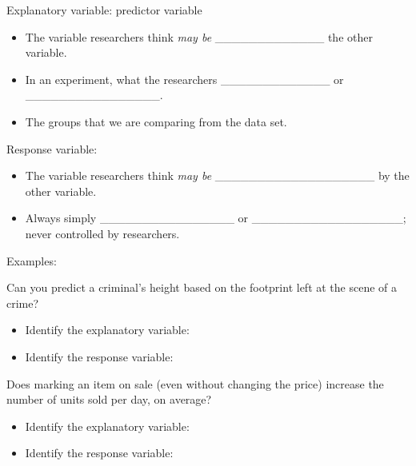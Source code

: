 \documentclass[
]{report}
\providecommand{\tightlist}{%
  \setlength{\itemsep}{0pt}\setlength{\parskip}{0pt}}
\begin{document}
Explanatory variable: predictor variable

\begin{itemize}
\item
  The variable researchers think \emph{may be} \_\_\_\_\_\_\_\_\_\_\_\_\_
  the other variable.
\item
  In an experiment, what the researchers \_\_\_\_\_\_\_\_\_\_\_\_\_ or \_\_\_\_\_\_\_\_\_\_\_\_\_\_\_\_.
\item
  The groups that we are comparing from the data set.
\end{itemize}

Response variable:

\begin{itemize}
\item
  The variable researchers think \emph{may be} \_\_\_\_\_\_\_\_\_\_\_\_\_\_\_\_\_\_\_ by the other variable.
\item
  Always simply \_\_\_\_\_\_\_\_\_\_\_\_\_\_\_\_ or \_\_\_\_\_\_\_\_\_\_\_\_\_\_\_\_\_\_; never controlled by researchers.
\end{itemize}

Examples:

Can you predict a criminal's height based on the footprint left at the scene of a crime?

\begin{itemize}
\tightlist
\item
  Identify the explanatory variable:
\end{itemize}

\vspace{0.25in}

\begin{itemize}
\tightlist
\item
  Identify the response variable:
\end{itemize}

\vspace{0.25in}

Does marking an item on sale (even without changing the price) increase the number of units sold per day, on average?

\begin{itemize}
\tightlist
\item
  Identify the explanatory variable:
\end{itemize}

\vspace{0.25in}

\begin{itemize}
\tightlist
\item
  Identify the response variable:
\end{itemize}
\end{document}
